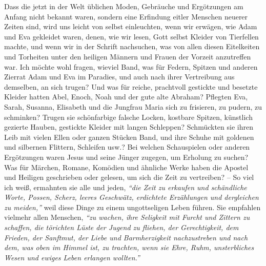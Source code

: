 Dass die jetzt in der Welt üblichen Moden, Gebräuche und Ergötzungen am Anfang
nicht bekannt waren, sondern eine Erfindung eitler Menschen neuerer Zeiten sind,
wird uns leicht von selbst einleuchten, wenn wir erwägen, wie
Adam und Eva
gekleidet waren, denen, wie wir lesen, Gott selbst Kleider von Tierfellen
machte, und wenn wir in der Schrift nachsuchen, was von allen diesen Eitelkeiten
und Torheiten unter den heiligen Männern und
Frauen der Vorzeit anzutreffen
war. Ich möchte wohl fragen, wieviel Band, was für Federn, Spitzen und anderen
Zierrat Adam und Eva im Paradies, und auch nach ihrer Vertreibung aus
demselben, an sich trugen? Und was für reiche, prachtvoll gestickte und besetzte
Kleider hatten Abel, Enoch,
Noah und der gute alte Abraham?
Pflegten Eva, Sarah,
Susanna, Elisabeth und die
Jungfrau Maria sich zu frisieren, zu pudern, zu
schminken? Trugen sie schönfarbige falsche Locken, kostbare Spitzen, künstlich
gezierte Hauben, gestickte Kleider mit langen
Schleppen? Schmückten sie ihren
Leib mit vielen Ellen oder ganzen Stücken Band, und ihre Schuhe mit goldenen und
silbernen Flittern, Schleifen usw.? Bei welchen Schauspielen oder anderen
Ergötzungen waren Jesus und seine Jünger zugegen, um Erholung zu suchen? Was für
Märchen, Romane, Komödien und
ähnliche Werke haben die Apostel und Heiligen
geschrieben oder gelesen, um sich die Zeit zu vertreiben? -- So viel ich weiß,
ermahnten sie alle und jeden,
\textit{"`die Zeit zu erkaufen und schändliche Worte,
Possen, Scherz, leeres Geschwätz, erdichtete Erzählungen und dergleichen zu
meiden,"'}
weil diese Dinge zu einem ungottseligen Leben führen. Sie empfahlen vielmehr
allen Menschen,
\textit{"`zu wachen, ihre Seligkeit mit Furcht und Zittern zu schaffen,
die törichten Lüste der Jugend zu fliehen, der Gerechtigkeit, dem Frieden, der
Sanftmut, der Liebe und Barmherzigkeit nachzustreben und nach dem, was oben
im Himmel ist, zu trachten, wenn sie Ehre, Ruhm, unsterbliches Wesen und ewiges
Leben erlangen wollten."'}

